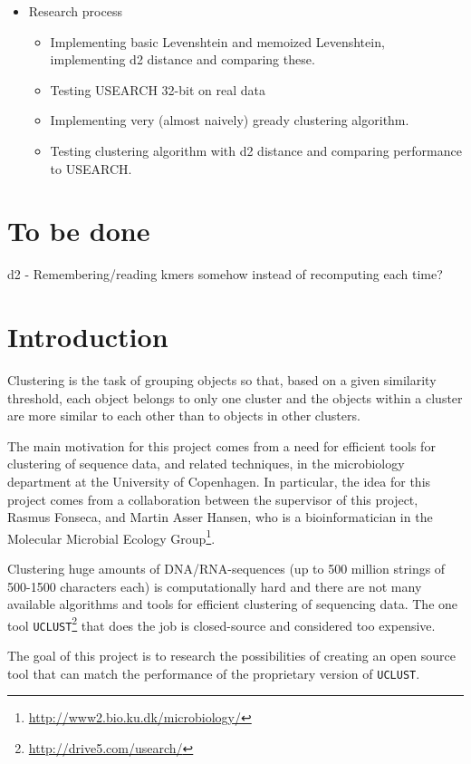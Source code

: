 \documentclass[11pt,a4paper]{article}
\begin{document}
\begin{itemize}
  \item Research process
    \begin{itemize}
      \item Implementing basic Levenshtein and memoized Levenshtein,
        implementing d2 distance and comparing these.
      \item Testing USEARCH 32-bit on real data
      \item Implementing very (almost naively) gready clustering algorithm.
      \item Testing clustering algorithm with d2 distance and comparing
        performance to USEARCH.
    \end{itemize}
\end{itemize}


\section{To be done}
d2 - Remembering/reading kmers somehow instead of recomputing each time?


\section{Introduction}
Clustering is the task of grouping objects so that, based on a given similarity
threshold, each object belongs to only one cluster and the
objects within a cluster are more similar to each other than to objects 
in other clusters.

The main motivation for this project comes from a need for efficient tools for
clustering of sequence data, and related techniques, in the microbiology
department at the University of Copenhagen. In particular, the idea for this
project comes from a collaboration between the supervisor of this project,
Rasmus Fonseca, and Martin Asser Hansen, who is a bioinformatician in the
Molecular Microbial Ecology
Group\footnote{\url{http://www2.bio.ku.dk/microbiology/}}.

Clustering huge amounts of DNA/RNA-sequences (up to 500
million strings of 500-1500 characters each) is computationally hard and there are not many available algorithms and tools for efficient clustering of
sequencing data. The one tool
\texttt{UCLUST}\footnote{\url{http://drive5.com/usearch/}} that does the job is
closed-source and considered too expensive.

The goal of this project is to research the possibilities of creating an open source tool that can match the performance of the proprietary version of
\texttt{UCLUST}.
\end{document}
